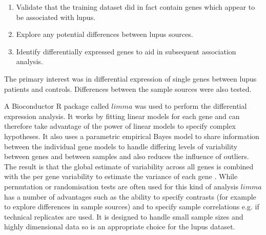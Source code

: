 \documentclass[a4paper, 12pt]{report}
\begin{document}
\begin{enumerate}
\item Validate that the training dataset did in fact contain genes which appear to be associated with lupus.
\item Explore any potential differences between lupus sources.
\item Identify differentially expressed genes to aid in subsequent association analysis.
\end{enumerate}

The primary interest was in differential expression of single genes between lupus patients and controls. Differences between the sample sources were also tested.

%

A Bioconductor R package called $limma$ \cite{limma} was used to perform the differential expression analysis.  It works by fitting linear models for each gene and can therefore take advantage of the power of linear models to specify complex hypotheses. It also uses a parametric empirical Bayes model to share information between the individual gene models to handle differing levels of variability between genes and between samples and also reduces the influence of outliers. The result is that the global estimate of variability across all genes is combined with the per gene variability to  estimate the variance of  each gene \cite{limma}. While permutation or randomisation tests are often used for this kind of analysis $limma$ has a number of advantages such as the ability to specify contrasts (for example to explore differences in sample sources) and to specify sample correlations e.g. if technical replicates are used.  It is designed to handle small sample sizes and highly dimensional data so is an appropriate choice for the lupus dataset.
\end{document}
